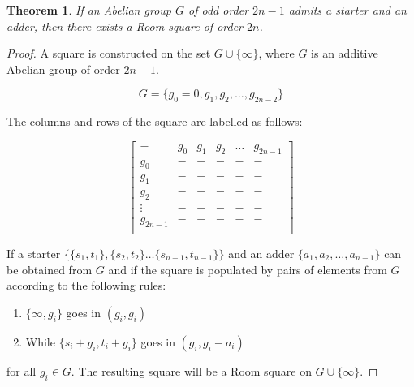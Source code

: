 \documentclass[11pt, a4paper]{book}\usepackage[]{graphicx}\usepackage[]{xcolor}
\newtheorem{theorem}{Theorem}
\begin{document}
\begin{theorem}
\label{thm:starter-adder}
If an Abelian group $G$ of odd order $2n - 1$ admits a starter
and an adder, then there exists a Room square of order $2n$.
\end{theorem}

\begin{proof}
A square is constructed on the set $G \cup \{\infty\}$, where $G$ is an
additive Abelian group of order $2n-1$.

\begin{equation}
G = \{g_0 = 0, g_1, g_2, \ldots, g_{2n-2}\}
\end{equation}

The columns and rows of the square are labelled as follows:

\begin{equation}
  \begin{bmatrix}
        -      & g_0  &  g_1  &  g_2  & \ldots &  g_{2n - 1} \\
       g_0     &   -  &   -   &   -   &    -   &     -       \\
       g_1     &   -  &   -   &   -   &    -   &     -       \\
       g_2     &   -  &   -   &   -   &    -   &     -       \\
     \vdots    &   -  &   -   &   -   &    -   &     -       \\
    g_{2n - 1} &   -  &   -   &   -   &    -   &     -       \\
  \end{bmatrix}
\end{equation}

If a starter
$\{\{s_1, t_1\}, \{s_2, t_2\} \ldots \{s_{n - 1}, t_{n - 1}\}\}$
and an
adder $\{a_1, a_2, \ldots, a_{n - 1}\}$ can be obtained from
$G$ and if the square is populated by pairs of elements from
$G$ according to the following rules:

\begin{enumerate}
  \item{$\{\infty, g_i\}$ goes in $(g_i, g_i)$}
  \item{While $\{s_i + g_i, t_i + g_i\}$ goes in $(g_i, g_i - a_i)$}
\end{enumerate}

for all $g_i \in G$. The resulting square will be a Room square on
$G \cup \{\infty\}$.


\end{proof}
\end{document}
